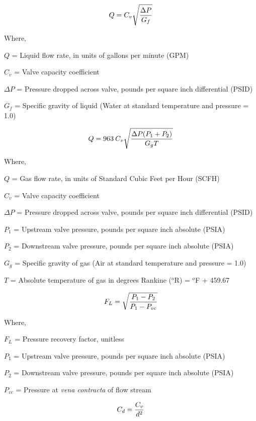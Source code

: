 

$$Q = C_v \sqrt{\Delta P \over G_f}$$

\noindent
Where,

$Q$ = Liquid flow rate, in units of gallons per minute (GPM)

$C_v$ = Valve capacity coefficient

$\Delta P$ = Pressure dropped across valve, pounds per square inch differential (PSID)

$G_f$ = Specific gravity of liquid (Water at standard temperature and pressure = 1.0)


\vskip 30pt

$$Q = 963 \> C_v \sqrt{{\Delta P (P_1 + P_2)} \over {G_g T}}$$

\noindent
Where,

$Q$ = Gas flow rate, in units of Standard Cubic Feet per Hour (SCFH)

$C_v$ = Valve capacity coefficient

$\Delta P$ = Pressure dropped across valve, pounds per square inch differential (PSID)

$P_1$ = Upstream valve pressure, pounds per square inch absolute (PSIA)

$P_2$ = Downstream valve pressure, pounds per square inch absolute (PSIA)

$G_g$ = Specific gravity of gas (Air at standard temperature and pressure = 1.0)

$T$ = Absolute temperature of gas in degrees Rankine ($^{o}$R) = $^{o}$F + 459.67

\vskip 30pt


$$F_L = \sqrt{{P_1 - P_2} \over {P_1 - P_{vc}}}$$
 
\noindent
Where,

$F_L$ = Pressure recovery factor, unitless

$P_1$ = Upstream valve pressure, pounds per square inch absolute (PSIA)

$P_2$ = Downstream valve pressure, pounds per square inch absolute (PSIA)

$P_{vc}$ = Pressure at {\it vena contracta} of flow stream

\vskip 30pt

$$C_d = {C_v \over d^2}$$

